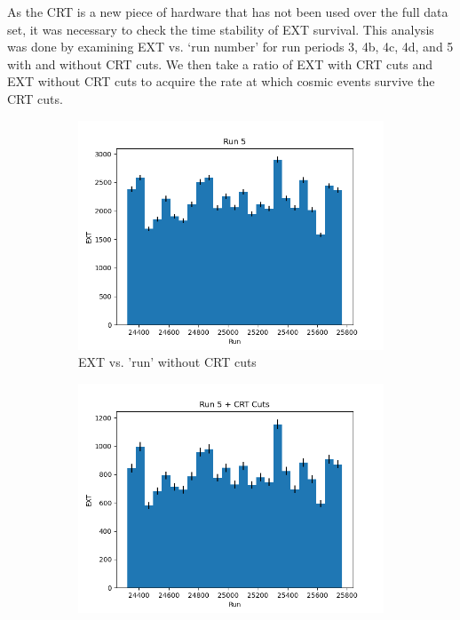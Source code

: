 As the CRT is a new piece of hardware that has not been used over the full data set, it was necessary to check the time stability of EXT survival. This analysis was done by examining EXT vs. `run number' for run periods 3, 4b, 4c, 4d, and 5 with and without CRT cuts. We then take a ratio of EXT with CRT cuts and EXT without CRT cuts to acquire the rate at which cosmic events survive the CRT cuts. 

\begin{figure}[H]
 \centering
    \begin{subfigure}[t]{0.31\linewidth}
        \includegraphics[width=\linewidth]{technote/EventSelections/FiguresCRT/run5_noCRT1.png}
        \caption{EXT vs. 'run' without CRT cuts}
    \end{subfigure}%
    \hspace{0.3cm}%
    \begin{subfigure}[t]{0.31\linewidth}
        \includegraphics[width=\linewidth]{technote/EventSelections/FiguresCRT/run5_CRT1.png}%

\end{subfigure}
\end{figure}
